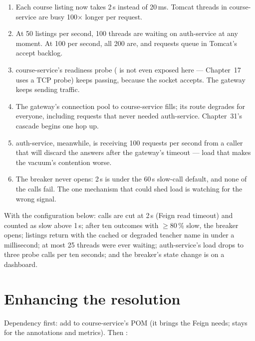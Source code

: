 \begin{enumerate}
  \item Each course listing now takes 2\,s instead of 20\,ms. Tomcat
  threads in course-service are busy 100$\times$ longer per request.
  \item At 50 listings per second, 100 threads are waiting on
  auth-service at any moment. At 100 per second, all 200 are, and
  requests queue in Tomcat's accept backlog.
  \item course-service's readiness probe ( is
  not even exposed here --- Chapter~17 uses a TCP probe) keeps passing,
  because the socket accepts. The gateway keeps sending traffic.
  \item The gateway's connection pool to course-service fills; its
   route degrades for everyone, including requests
  that never needed auth-service. Chapter~31's cascade begins one hop
  up.
  \item auth-service, meanwhile, is receiving 100 requests per second
  from a caller that will discard the answers after the gateway's
  timeout --- load that makes the vacuum's contention worse.
  \item The breaker never opens: 2\,s is under the 60\,s slow-call
  default, and none of the calls fail. The one mechanism that could
  shed load is watching for the wrong signal.
\end{enumerate}

With the configuration below: calls are cut at 2\,s (Feign read
timeout) and counted as slow above 1\,s; after ten outcomes with
$\ge$80\,\% slow, the breaker opens; listings return with the cached or
degraded teacher name in under a millisecond; at most 25 threads were
ever waiting; auth-service's load drops to three probe calls per ten
seconds; and the breaker's state change is on a dashboard.

\section{Enhancing the resolution}
\label{sec:res-enhance}

Dependency first: add 
to course-service's POM (it brings the 
Feign needs;  stays for the annotations
and metrics). Then :

